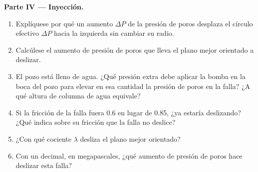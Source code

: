 \begin{problem}
\medskip
\noindent\textbf{Parte IV --- Inyección.}
\begin{enumerate}[resume]
  \item Explíquese por qué un aumento $\Delta P$ de la presión de poros desplaza el círculo efectivo $\Delta P$ hacia la
        izquierda sin cambiar su radio.
  \item Calcúlese el aumento de presión de poros que lleva el plano mejor orientado a deslizar.
  \item El pozo está lleno de agua. ¿Qué presión extra debe aplicar la bomba en la boca del pozo para elevar en esa cantidad
        la presión de poros en la falla? ¿A qué altura de columna de agua equivale?
  \item Si la fricción de la falla fuera 0.6 en lugar de 0.85, ¿ya estaría deslizando? ¿Qué indica sobre su fricción que la
        falla no deslice?
  \item ¿Con qué cociente $\lambda$ desliza el plano mejor orientado?
  \item Con un decimal, en megapascales, ¿qué aumento de presión de poros hace deslizar esta falla?
\end{enumerate}
\end{problem}
